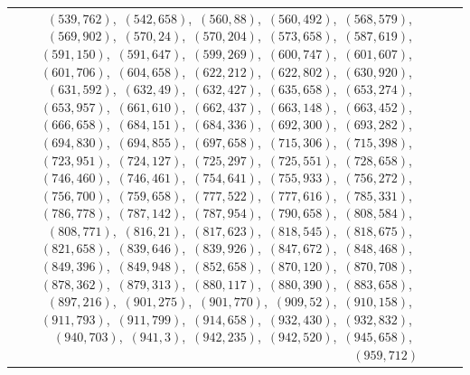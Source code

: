 \documentclass[11pt]{article}
\begin{document}
\begin{longtable}{@{}rrl>{\raggedright\arraybackslash}p{}@{}}
$(539,762)$,\allowbreak\ $(542,658)$,\allowbreak\ $(560,88)$,\allowbreak\ $(560,492)$,\allowbreak\ $(568,579)$,\allowbreak\ $(569,902)$,\allowbreak\ $(570,24)$,\allowbreak\ $(570,204)$,\allowbreak\ $(573,658)$,\allowbreak\ $(587,619)$,\allowbreak\ $(591,150)$,\allowbreak\ $(591,647)$,\allowbreak\ $(599,269)$,\allowbreak\ $(600,747)$,\allowbreak\ $(601,607)$,\allowbreak\ $(601,706)$,\allowbreak\ $(604,658)$,\allowbreak\ $(622,212)$,\allowbreak\ $(622,802)$,\allowbreak\ $(630,920)$,\allowbreak\ $(631,592)$,\allowbreak\ $(632,49)$,\allowbreak\ $(632,427)$,\allowbreak\ $(635,658)$,\allowbreak\ $(653,274)$,\allowbreak\ $(653,957)$,\allowbreak\ $(661,610)$,\allowbreak\ $(662,437)$,\allowbreak\ $(663,148)$,\allowbreak\ $(663,452)$,\allowbreak\ $(666,658)$,\allowbreak\ $(684,151)$,\allowbreak\ $(684,336)$,\allowbreak\ $(692,300)$,\allowbreak\ $(693,282)$,\allowbreak\ $(694,830)$,\allowbreak\ $(694,855)$,\allowbreak\ $(697,658)$,\allowbreak\ $(715,306)$,\allowbreak\ $(715,398)$,\allowbreak\ $(723,951)$,\allowbreak\ $(724,127)$,\allowbreak\ $(725,297)$,\allowbreak\ $(725,551)$,\allowbreak\ $(728,658)$,\allowbreak\ $(746,460)$,\allowbreak\ $(746,461)$,\allowbreak\ $(754,641)$,\allowbreak\ $(755,933)$,\allowbreak\ $(756,272)$,\allowbreak\ $(756,700)$,\allowbreak\ $(759,658)$,\allowbreak\ $(777,522)$,\allowbreak\ $(777,616)$,\allowbreak\ $(785,331)$,\allowbreak\ $(786,778)$,\allowbreak\ $(787,142)$,\allowbreak\ $(787,954)$,\allowbreak\ $(790,658)$,\allowbreak\ $(808,584)$,\allowbreak\ $(808,771)$,\allowbreak\ $(816,21)$,\allowbreak\ $(817,623)$,\allowbreak\ $(818,545)$,\allowbreak\ $(818,675)$,\allowbreak\ $(821,658)$,\allowbreak\ $(839,646)$,\allowbreak\ $(839,926)$,\allowbreak\ $(847,672)$,\allowbreak\ $(848,468)$,\allowbreak\ $(849,396)$,\allowbreak\ $(849,948)$,\allowbreak\ $(852,658)$,\allowbreak\ $(870,120)$,\allowbreak\ $(870,708)$,\allowbreak\ $(878,362)$,\allowbreak\ $(879,313)$,\allowbreak\ $(880,117)$,\allowbreak\ $(880,390)$,\allowbreak\ $(883,658)$,\allowbreak\ $(897,216)$,\allowbreak\ $(901,275)$,\allowbreak\ $(901,770)$,\allowbreak\ $(909,52)$,\allowbreak\ $(910,158)$,\allowbreak\ $(911,793)$,\allowbreak\ $(911,799)$,\allowbreak\ $(914,658)$,\allowbreak\ $(932,430)$,\allowbreak\ $(932,832)$,\allowbreak\ $(940,703)$,\allowbreak\ $(941,3)$,\allowbreak\ $(942,235)$,\allowbreak\ $(942,520)$,\allowbreak\ $(945,658)$,\allowbreak\ $(959,712)$\\

\end{longtable}
\end{document}
